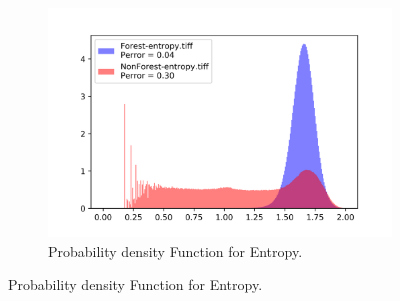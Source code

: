 \begin{figure}[H]
\begin{subfigure}[b]{0.4\linewidth}
    \includegraphics[width=\linewidth]{Chapter4/sum_and_diff_textures/entropy_hist.png}
     \caption{Probability density Function for Entropy.}
  \end{subfigure}
\end{figure}


